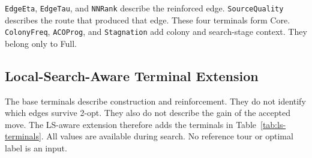 \documentclass[letterpaper,journal]{IEEEtran}
\begin{document}
\texttt{EdgeEta}, \texttt{EdgeTau}, and \texttt{NNRank} describe the reinforced
edge.
\texttt{SourceQuality} describes the route that produced that edge.
These four terminals form Core.
\texttt{ColonyFreq}, \texttt{ACOProg}, and \texttt{Stagnation} add colony and
search-stage context.
They belong only to Full.

\subsection{Local-Search-Aware Terminal Extension}

The base terminals describe construction and reinforcement.
They do not identify which edges survive 2-opt.
They also do not describe the gain of the accepted move.
The LS-aware extension therefore adds the terminals in
Table~\ref{tab:ls-terminals}.
All values are available during search.
No reference tour or optimal label is an input.
\end{document}
